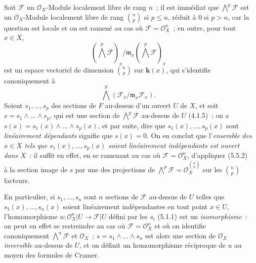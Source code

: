 \begin{env}[5.5.4]
\label{0.5.5.4-fr}
Soit $\mathcal{F}$ un $\mathcal{O}_X$-Module localement libre de rang $n$~;
il est immédiat que $\bigwedge^p\mathcal{F}$ est un $\mathcal{O}_X$-Module
localement libre de rang $\binom{n}{p}$ si $p\leq n$, réduit à $0$ si $p>n$,
car la question est locale et on est ramené au cas où
$\mathcal{F}=\mathcal{O}_X^n$~; en outre, pour tout $x\in X$,
\[
  (\bigwedge^p\mathcal{F})_x/
  \mathfrak{m}_x(\bigwedge^p\mathcal{F})_x
\]
est un espace vectoriel de dimension $\binom{n}{p}$ sur $\boldsymbol{k}(x)$, qui
s'identifie canoniquement à
\[
  \bigwedge^p(\mathcal{F}_x/\mathfrak{m}_x\mathcal{F}_x).
\]
Soient
$s_1,\ldots,s_p$ des sections de $F$ au-dessus d'un ouvert $U$ de $X$, et
soit $s=s_1\wedge\ldots\wedge s_p$, qui est une section de
$\bigwedge^p\mathcal{F}$ au-dessus de $U$ (4.1.5)~; on a
$s(x)=s_1(x)\wedge\ldots\wedge s_p(x)$, et par suite, dire que
$s_1(x),\ldots,s_p(x)$ sont \emph{linéairement dépendants} signifie que
$s(x)=0$. On en conclut que l'\emph{ensemble des $x\in X$ tels que
$s_1(x),\ldots,s_p(x)$ soient linéairement indépendants est ouvert dans
$X$}~: il suffit en effet, en se ramenant au cas où
$\mathcal{F}=\mathcal{O}_X^n$, d'appliquer (5.5.2) à la section image de $s$
par une des projections de
$\bigwedge^p\mathcal{F}=\mathcal{O}_X^{\binom{n}{p}}$ sur les
$\binom{n}{p}$ facteurs.

En particulier, si $s_1,\ldots,s_n$ sont $n$ sections de $\mathcal{F}$
au-dessus de $U$ telles que $s_1(x),\ldots,s_n(x)$ soient linéairement
indépendantes en tout point $x\in U$, l'homomorphisme
$u:\mathcal{O}_X^n|U\to\mathcal{F}|U$ défini par les $s_i$ (5.1.1) est un
\emph{isomorphisme}~: on peut en effet se restreindre au cas où
$\mathcal{F}=\mathcal{O}_X^n$ et où on identifie canoniquement
$\bigwedge^n\mathcal{F}$ et $\mathcal{O}_X$~;
$s=s_1\wedge\ldots\wedge s_n$ est alors une section de $\mathcal{O}_X$
\emph{inversible} au-dessus de $U$, et on définit un homomorphisme réciproque
de $u$ au moyen des formules de Cramer.
\end{env}

